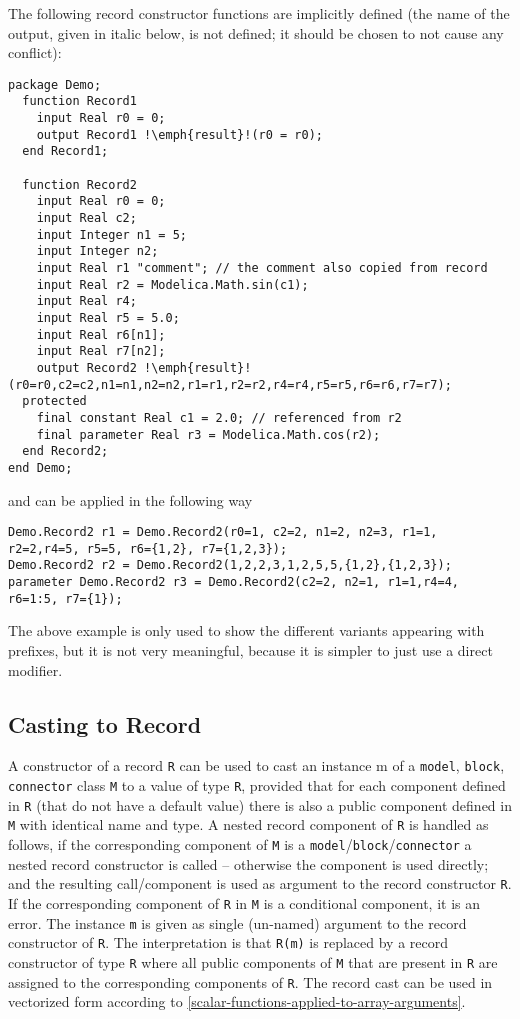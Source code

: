 \begin{nonnormative}
The following record constructor functions are implicitly defined
(the name of the output, given in italic below, is not defined; it
should be chosen to not cause any conflict):
\begin{lstlisting}[language=modelica,escapechar=!]
package Demo;
  function Record1
    input Real r0 = 0;
    output Record1 !\emph{result}!(r0 = r0);
  end Record1;

  function Record2
    input Real r0 = 0;
    input Real c2;
    input Integer n1 = 5;
    input Integer n2;
    input Real r1 "comment"; // the comment also copied from record
    input Real r2 = Modelica.Math.sin(c1);
    input Real r4;
    input Real r5 = 5.0;
    input Real r6[n1];
    input Real r7[n2];
    output Record2 !\emph{result}!(r0=r0,c2=c2,n1=n1,n2=n2,r1=r1,r2=r2,r4=r4,r5=r5,r6=r6,r7=r7);
  protected
    final constant Real c1 = 2.0; // referenced from r2
    final parameter Real r3 = Modelica.Math.cos(r2);
  end Record2;
end Demo;
\end{lstlisting}
and can be applied in the following way
\begin{lstlisting}[language=modelica]
Demo.Record2 r1 = Demo.Record2(r0=1, c2=2, n1=2, n2=3, r1=1, r2=2,r4=5, r5=5, r6={1,2}, r7={1,2,3});
Demo.Record2 r2 = Demo.Record2(1,2,2,3,1,2,5,5,{1,2},{1,2,3});
parameter Demo.Record2 r3 = Demo.Record2(c2=2, n2=1, r1=1,r4=4, r6=1:5, r7={1});
\end{lstlisting}

The above example is only used to show the different variants
appearing with prefixes, but it is not very meaningful, because it is
simpler to just use a direct modifier.
\end{nonnormative}

\subsection{Casting to Record}\label{casting-to-record}

A constructor of a record \lstinline!R! can be used to cast an instance m of a
\lstinline!model!, \lstinline!block!, \lstinline!connector! class \lstinline!M! to a value of type \lstinline!R!, provided that for
each component defined in \lstinline!R! (that do not have a default value) there is
also a public component defined in \lstinline!M! with identical name and type. A
nested record component of \lstinline!R! is handled as follows, if the corresponding
component of \lstinline!M! is a \lstinline!model!/\lstinline!block!/\lstinline!connector! a nested record constructor is
called -- otherwise the component is used directly; and the resulting
call/component is used as argument to the record constructor \lstinline!R!. If the
corresponding component of \lstinline!R! in \lstinline!M! is a conditional component, it is an
error. The instance \lstinline!m! is given as single (un-named)
argument to the record constructor of \lstinline!R!. The interpretation is that \lstinline!R(m)!
is replaced by a record constructor of type \lstinline!R! where all public
components of \lstinline!M! that are present in \lstinline!R! are assigned to the corresponding
components of \lstinline!R!. The record cast can be used in vectorized form
according to \cref{scalar-functions-applied-to-array-arguments}.

